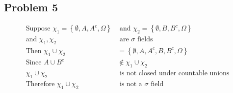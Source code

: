 \documentclass{article}
\begin{document}
\begin{flushleft}
\section*{Problem 5}
\begin{align*}
\text{Suppose } \chi_1=\left\{\emptyset,A,A^c,\Omega \right\} &\text{ and }
\chi_2=\left\{\emptyset,B,B^c,\Omega \right\}\\
\text{and } \chi_1,\chi_2 &\text{ are } \sigma \text{ fields}\\
\text{Then } \chi_1 \cup \chi_2 &= \left\{\emptyset,A,A^c,B,B^c,\Omega \right\}\\
\text{Since } A \cup B^c &\notin \chi_1 \cup \chi_2\\
\chi_1 \cup \chi_2 &\text{ is not closed under countable unions}\\
\text{Therefore } \chi_1 \cup \chi_2 &\text{ is not a } \sigma \text{ field}
\end{align*}

\end{flushleft}
\end{document}
